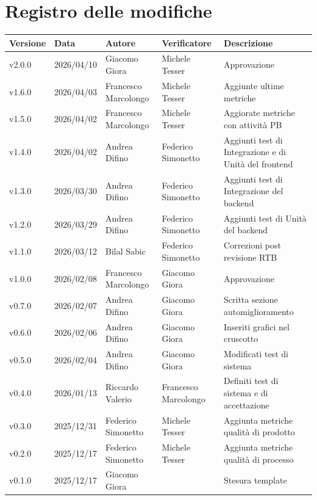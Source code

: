 \documentclass[a4paper,12pt]{article}
\newcommand{\DataUltimaModifica}{2026/04/10}
\newcommand{\VersioneDocumento}{v2.0.0} %
\begin{document}
\section*{Registro delle modifiche}
    \begin{center}
        \begin{tabularx}{\textwidth}{|l|l|l|l|X|}
            \hline
            \rowcolor{lightgray}
            \textbf{Versione} & \textbf{Data} & \textbf{Autore} & \textbf{Verificatore} & \textbf{Descrizione} \\
            \hline
            \VersioneDocumento & \DataUltimaModifica & Giacomo Giora & Michele Tesser & Approvazione \\
            \hline
            v1.6.0 & 2026/04/03 & Francesco Marcolongo & Michele Tesser & Aggiunte ultime metriche \\
            \hline
            v1.5.0 & 2026/04/02 & Francesco Marcolongo & Michele Tesser & Aggiorate metriche con attività PB \\
            \hline
            v1.4.0 & 2026/04/02 & Andrea Difino & Federico Simonetto & Aggiunti test di Integrazione e di Unità del frontend \\
            \hline
            v1.3.0 & 2026/03/30 & Andrea Difino & Federico Simonetto & Aggiunti test di Integrazione del backend \\
            \hline
            v1.2.0 & 2026/03/29 & Andrea Difino & Federico Simonetto & Aggiunti test di Unità del backend \\ 
            \hline
            v1.1.0 & 2026/03/12 & Bilal Sabic & Federico Simonetto & Correzioni post revisione RTB \\ 
            \hline
            v1.0.0 & 2026/02/08 & Francesco Marcolongo & Giacomo Giora & Approvazione \\ 
            \hline
            v0.7.0 & 2026/02/07 & Andrea Difino & Giacomo Giora & Scritta sezione automiglioramento \\ 
            \hline
            v0.6.0 & 2026/02/06 & Andrea Difino & Giacomo Giora & Inseriti grafici nel cruscotto \\ 
            \hline
            v0.5.0 & 2026/02/04 & Andrea Difino & Giacomo Giora & Modificati test di sistema \\ 
            \hline
            v0.4.0 & 2026/01/13 & Riccardo Valerio & Francesco Marcolongo & Definiti test di sistema e di accettazione \\ 
            \hline
            v0.3.0 & 2025/12/31 & Federico Simonetto & Michele Tesser & Aggiunta metriche qualità di prodotto \\ 
            \hline
            v0.2.0 & 2025/12/17 & Federico Simonetto & Michele Tesser & Aggiunta metriche qualità di processo \\
            \hline
            v0.1.0 & 2025/12/17 & Giacomo Giora & & Stesura template \\
            \hline
        \end{tabularx}
    \end{center}
\end{document}
